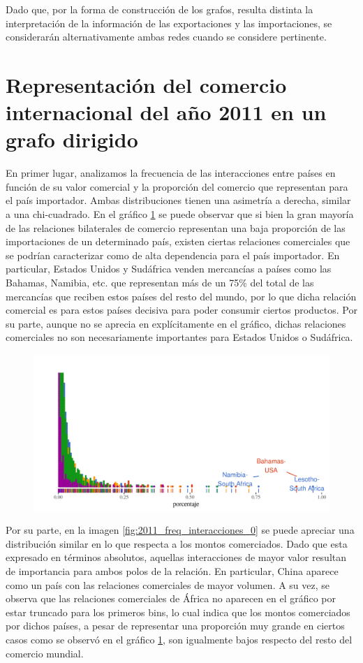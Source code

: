 \documentclass[runningheads,a4paper]{llncs}
\begin{document}
Dado que, por la forma de construcción de los grafos, resulta distinta la interpretación de la información de las exportaciones y las importaciones, se considerarán alternativamente ambas redes cuando se considere pertinente. 

\section{Representación del comercio internacional del año 2011 en un grafo dirigido}
En primer lugar, analizamos la frecuencia de las interacciones entre países en función de su valor comercial y la proporción del comercio que representan para el país importador. Ambas distribuciones tienen una asimetría a derecha, similar a una chi-cuadrado. En el gráfico \ref{fig:2011_freq_interacciones_3} se puede observar que si bien la gran mayoría de las relaciones bilaterales de comercio representan una baja proporción de las importaciones de un determinado país, existen ciertas relaciones comerciales que se podrían caracterizar como de alta dependencia para el país importador. En particular, Estados Unidos y Sudáfrica venden mercancías a países como las Bahamas, Namibia, etc. que representan más de un 75\% del total de las mercancías que reciben estos países del resto del mundo, por lo que dicha relación comercial es para estos países decisiva para poder consumir ciertos productos. Por su parte, aunque no se aprecia en explícitamente en el gráfico, dichas relaciones comerciales no son necesariamente importantes para Estados Unidos o Sudáfrica.

\begin{figure}[h]
    \centering
    \includegraphics[scale=.5]{2011_freq_interacciones_3}
    \caption{}
    \label{fig:2011_freq_interacciones_3}
\end{figure}

Por su parte, en la imagen \ref{fig:2011_freq_interacciones_0} se puede apreciar una distribución similar en lo que respecta a los montos comerciados. Dado que esta expresado en términos absolutos, aquellas interacciones de mayor valor resultan de importancia para ambos polos de la relación. En particular, China aparece como un país con las relaciones comerciales de mayor volumen. A su vez, se observa que las relaciones comerciales de África no aparecen en el gráfico por estar truncado para los primeros bins, lo cual indica que los montos comerciados por dichos países, a pesar de representar una proporción muy grande en ciertos casos como se observó en el gráfico \ref{fig:2011_freq_interacciones_3}, son igualmente bajos respecto del resto del comercio mundial.
\end{document}
